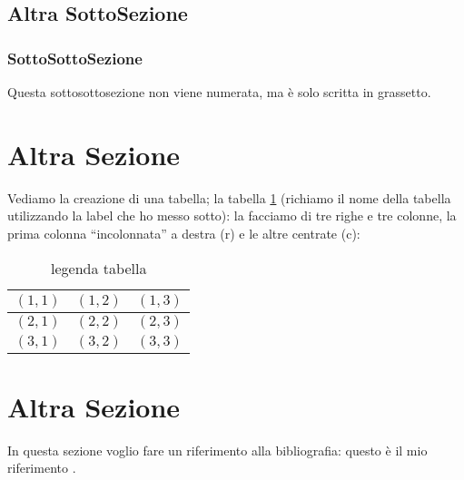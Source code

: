 \documentclass[12pt,a4paper,openright,twoside]{report}
\begin{document}
\subsection{Altra SottoSezione}

\subsubsection{SottoSottoSezione}Questa sottosottosezione non viene
numerata, ma \`e solo scritta in grassetto.


\section{Altra Sezione} %
Vediamo la creazione di una tabella; la tabella \ref{tab:uno}
(richiamo il nome della tabella utilizzando la label che ho messo sotto):
la facciamo di tre righe e tre colonne, la prima colonna
``incolonnata'' a destra (r) e le altre centrate (c):\\
\begin{table}[h] %
\begin{center} %
\begin{tabular}{r|c|c} %
\hline \hline                           %
$(1,1)$ & $(1,2)$ & $(1,3)$\\ %
\hline                                  %
$(2,1)$ & $(2,2)$ & $(2,3)$\\ %
\hline                                  %
$(3,1)$ & $(3,2)$ & $(3,3)$\\
\hline \hline                           %
\end{tabular}
\caption[legenda elenco tabelle]{legenda tabella}\label{tab:uno}
\end{center}
\end{table}


\section{Altra Sezione}\label{sec:prova}%
In questa sezione voglio fare un riferimento alla bibliografia: questo \`e il mio riferimento \cite{gori2022metrics}.
\end{document}
